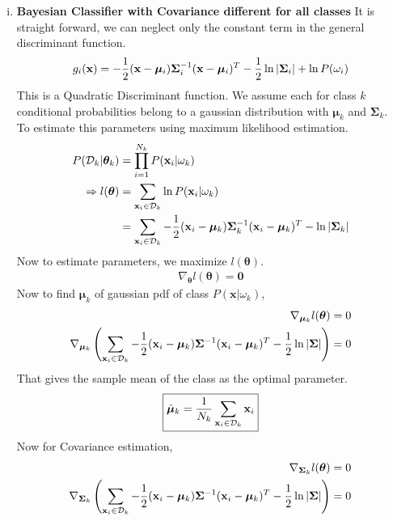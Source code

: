 \documentclass[11pt,paper=a4,answers]{exam}
\renewcommand{\vec}[1]{\mathbf{#1}}
\begin{document}
\begin{questions}
\begin{enumerate}[i.]
        \item \textbf{Bayesian Classifier with Covariance different for all classes}
        It is straight forward, we can neglect only the constant term in the general discriminant function.
        $$g_i(\vec{x}) = -{1 \over 2} (\vec{x} - \bm{\mu}_i) \bm{\Sigma}_i ^{-1} (\vec{x} - \bm{\mu}_i)^T - {1 \over 2}\ln|\bm{\Sigma}_i| + \ln P(\omega_i)$$
        This is a Quadratic Discriminant function. We assume each for class $k$ conditional probabilities belong to a gaussian distribution with $\bm{\mu}_k$ and $\bm{\Sigma}_k$.\\
        To estimate this parameters using maximum likelihood estimation.
        \begin{align*}
            P(\mathcal{D}_k| \bm{\theta}_k) &= \prod _{i=1}^{N_k} P(\vec{x}_i| \omega_k)\\
            \Rightarrow l(\bm{\theta}) &= \sum_{\vec{x}_i \in \mathcal{D}_k} \ln P(\vec{x}_i | \omega_k) \\
            &= \sum_{\vec{x}_i \in \mathcal{D}_k} -{1 \over 2}(\vec{x}_i - \bm{\mu}_k) \bm{\Sigma}_k^{-1} (\vec{x}_i - \bm{\mu}_k)^T - \ln |\bm{\Sigma}_k|\\
        \end{align*}
        Now to estimate parameters, we maximize $l(\bm{\theta})$. 
        \begin{align*}
            \nabla _{\bm{\theta}} l(\bm{\theta}) = \bm{0}
        \end{align*}
        Now to find $\bm{\mu}_k$ of gaussian pdf of class $P(\vec{x}| \omega_k)$,
        \begin{align*}
            \nabla _{\bm{\mu}_k} l(\bm{\theta}) &= 0 \\
            \nabla _{\bm{\mu}_k} \left( \sum_{\vec{x}_i \in \mathcal{D}_k} -{1 \over 2}(\vec{x}_i - \bm{\mu}_k) \bm{\Sigma}^{-1} (\vec{x}_i - \bm{\mu}_k)^T - {1 \over 2} \ln |\bm{\Sigma}| \right) &= 0\\
        \end{align*}
        That gives the sample mean of the class as the optimal parameter.
        $$\boxed{\hat{\bm{\mu}}_k = {1 \over N_k} \sum_{\vec{x}_i \in \mathcal{D}_k} \vec{x}_i }$$
        Now for Covariance estimation,
        \begin{align*}
            \nabla _{\bm{\Sigma}_k} l(\bm{\theta}) &= 0 \\
            \nabla _{\bm{\Sigma}_k} \left( \sum_{\vec{x}_i \in \mathcal{D}_k} -{1 \over 2}(\vec{x}_i - \bm{\mu}_k) \bm{\Sigma}^{-1} (\vec{x}_i - \bm{\mu}_k)^T - {1 \over 2} \ln |\bm{\Sigma}| \right) &= 0\\

\end{align*}
\end{enumerate}
\end{questions}
\end{document}

